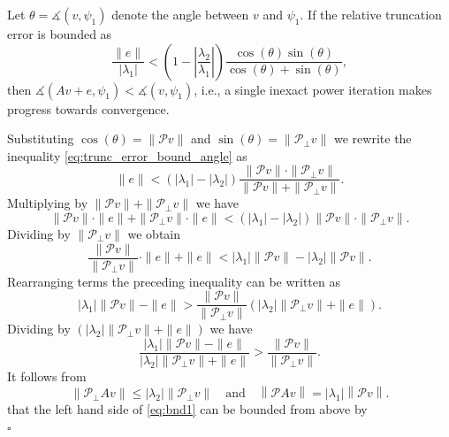 \documentclass[10pt,a4paper]{amsart}
\def\P{\mathcal{P}}
\newenvironment{proof}{{\noindent \bf \em Proof:}}{\hfill$\square$}
\begin{document}
\begin{theorem} \label{thm:pwr_convergence} 
Let $\theta = \measuredangle(v,\psi_1)$ denote the angle between $v$ and $\psi_1$. If the relative truncation error is bounded as 
\begin{equation} \label{eq:trunc_error_bound_angle}
    \frac{\|e\|}{|\lambda_1|} < \left(1 - \left|\frac{\lambda_2}{\lambda_1}\right|\right)
    \frac{\cos(\theta) \sin(\theta)}{\cos(\theta) + \sin(\theta)}, 
\end{equation}
then $\measuredangle(Av+e,\psi_1) < \measuredangle(v,\psi_1)$, i.e., a single inexact power iteration makes progress towards convergence. 
\end{theorem}

\begin{proof}
Substituting $\cos(\theta) = \|\P v\|$ and $\sin(\theta)=\|\P_{\perp}v\|$ we rewrite the inequality \eqref{eq:trunc_error_bound_angle} as 
\begin{equation}
\|e\| < \left(|\lambda_1| - |\lambda_2| \right)\frac{\|\P v\| \cdot \|\P_{\perp} v\|}{\|\P v\| + \|\P_{\perp} v\|}. 
\end{equation}
Multiplying by $\|\P v\| + \|\P_{\perp} v\|$ we have 
$$
\|\P v\|\cdot \|e\| + \|\P_{\perp} v\| \cdot \|e\| < \left(|\lambda_1| - |\lambda_2| \right) \|\P v\| \cdot \|\P_{\perp} v\|. 
$$
Dividing by $\|\P_{\perp} v\|$ we obtain 
$$
\frac{\|\P v\|}{\|\P_{\perp} v\|} \cdot \|e\| + \|e\| < |\lambda_1| \|\P v\| - |\lambda_2|\|\P v\|. 
$$
Rearranging terms the preceding inequality can be written as 
$$
|\lambda_1| \|\P v\| - \|e\| > \frac{\|\P v\|}{\|\P_{\perp} v\|} \left( |\lambda_2| \|\P_{\perp} v\| + \|e\|\right). 
$$
Dividing by $\left( |\lambda_2| \|\P_{\perp} v\| + \|e\|\right)$ we have 
\begin{equation} \label{eq:bnd1}
\frac{|\lambda_1| \|\P v\| - \|e\|}{|\lambda_2| \|\P_{\perp} v\| + \|e\|} > \frac{\|\P v\|}{\|\P_{\perp} v\|}. 
\end{equation}
%
It follows from 
\begin{equation} 
\left\| \P_{\perp} Av \right\| \leq  |\lambda_2|\left\|\P_{\perp} v\right\|
\quad \text{and} \quad 
\left\| \P Av \right\| = |\lambda_1|\left\|\P v\right\|. 
\end{equation} 
that the left hand side of \eqref{eq:bnd1} can be bounded from above by 
\begin{equation} \label{eq:ineq1}

\end{equation}
\end{proof}
\end{document}
